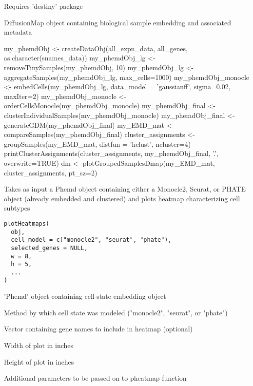 \documentclass[a4paper]{book}
\begin{document}
%
\begin{Details}\relax
Requires 'destiny' package
\end{Details}
%
\begin{Value}
DiffusionMap object containing biological sample embedding and associated metadata
\end{Value}
%
\begin{Examples}
\begin{ExampleCode}

my_phemdObj <- createDataObj(all_expn_data, all_genes, as.character(snames_data))
my_phemdObj_lg <- removeTinySamples(my_phemdObj, 10)
my_phemdObj_lg <- aggregateSamples(my_phemdObj_lg, max_cells=1000)
my_phemdObj_monocle <- embedCells(my_phemdObj_lg, data_model = 'gaussianff', sigma=0.02, maxIter=2)
my_phemdObj_monocle <- orderCellsMonocle(my_phemdObj_monocle)
my_phemdObj_final <- clusterIndividualSamples(my_phemdObj_monocle)
my_phemdObj_final <- generateGDM(my_phemdObj_final)
my_EMD_mat <- compareSamples(my_phemdObj_final)
cluster_assignments <- groupSamples(my_EMD_mat, distfun = 'hclust', ncluster=4)
printClusterAssignments(cluster_assignments, my_phemdObj_final, '.', overwrite=TRUE)
dm <- plotGroupedSamplesDmap(my_EMD_mat, cluster_assignments, pt_sz=2)

\end{ExampleCode}
\end{Examples}
%
\begin{Description}\relax
Takes as input a Phemd object containing either a Monocle2, Seurat, or PHATE object (already embedded and clustered) and plots heatmap characterizing cell subtypes
\end{Description}
%
\begin{Usage}
\begin{verbatim}
plotHeatmaps(
  obj,
  cell_model = c("monocle2", "seurat", "phate"),
  selected_genes = NULL,
  w = 8,
  h = 5,
  ...
)
\end{verbatim}
\end{Usage}
%
\begin{Arguments}
\begin{ldescription}
\item[\code{obj}] 'Phemd' object containing cell-state embedding object

\item[\code{cell\_model}] Method by which cell state was modeled ("monocle2", "seurat", or "phate")

\item[\code{selected\_genes}] Vector containing gene names to include in heatmap (optional)

\item[\code{w}] Width of plot in inches

\item[\code{h}] Height of plot in inches

\item[\code{...}] Additional parameters to be passed on to pheatmap function
\end{ldescription}
\end{Arguments}
\end{document}
